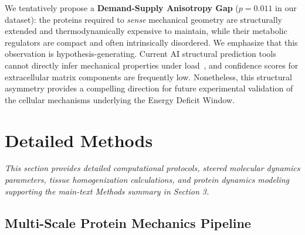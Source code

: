We tentatively propose a \textbf{Demand-Supply Anisotropy Gap} ($p = 0.011$ in our dataset): the proteins required to \emph{sense} mechanical geometry are structurally extended and thermodynamically expensive to maintain, while their metabolic regulators are compact and often intrinsically disordered. We emphasize that this observation is hypothesis-generating. Current AI structural prediction tools cannot directly infer mechanical properties under load~\cite{gomes2022protein, zonta2024sequence}, and confidence scores for extracellular matrix components are frequently low. Nonetheless, this structural asymmetry provides a compelling direction for future experimental validation of the cellular mechanisms underlying the Energy Deficit Window.


\section{Detailed Methods}
\label{sec:supp_methods}

\textit{This section provides detailed computational protocols, steered molecular dynamics parameters, tissue homogenization calculations, and protein dynamics modeling supporting the main-text Methods summary in Section 3.}

\subsection{Multi-Scale Protein Mechanics Pipeline}


